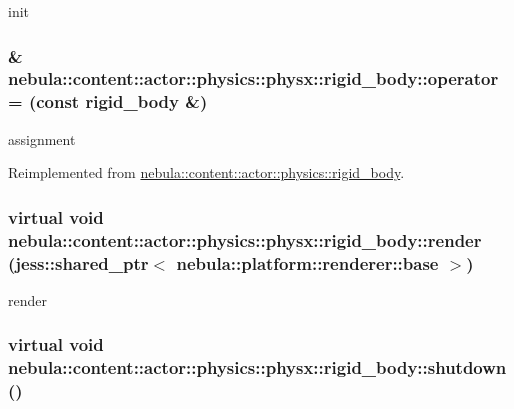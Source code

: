 init \hypertarget{classnebula_1_1content_1_1actor_1_1physics_1_1physx_1_1rigid__body_af787176f75d680ab3ca2ad56ac64484e}{
\subsubsection[{operator=}]{\& nebula::content::actor::physics::physx::rigid\_\-body::operator= (const {\bf rigid\_\-body} \&)}}
\label{classnebula_1_1content_1_1actor_1_1physics_1_1physx_1_1rigid__body_af787176f75d680ab3ca2ad56ac64484e}


assignment 

Reimplemented from \hyperlink{classnebula_1_1content_1_1actor_1_1physics_1_1rigid__body_afeaa8197cacc9b3f9e2b618f0ee0443b}{nebula::content::actor::physics::rigid\_\-body}.\hypertarget{classnebula_1_1content_1_1actor_1_1physics_1_1physx_1_1rigid__body_a10d2a077db15282d4a53ce95264704a3}{
\subsubsection[{render}]{\setlength{\rightskip}{0pt plus 5cm}virtual void nebula::content::actor::physics::physx::rigid\_\-body::render (jess::shared\_\-ptr$<$ {\bf nebula::platform::renderer::base} $>$)}}
\label{classnebula_1_1content_1_1actor_1_1physics_1_1physx_1_1rigid__body_a10d2a077db15282d4a53ce95264704a3}


render \hypertarget{classnebula_1_1content_1_1actor_1_1physics_1_1physx_1_1rigid__body_a92e7c3f4ca5dad35ae7c656a64a18a0c}{
\subsubsection[{shutdown}]{\setlength{\rightskip}{0pt plus 5cm}virtual void nebula::content::actor::physics::physx::rigid\_\-body::shutdown ()}}
\label{classnebula_1_1content_1_1actor_1_1physics_1_1physx_1_1rigid__body_a92e7c3f4ca5dad35ae7c656a64a18a0c}


